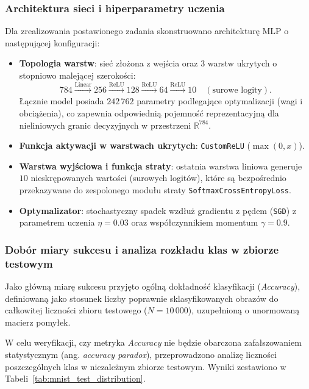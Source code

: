 \documentclass[11pt,a4paper]{article}
\begin{document}
\subsubsection{Architektura sieci i hiperparametry uczenia}
Dla zrealizowania postawionego zadania skonstruowano architekturę MLP o następującej konfiguracji:
\begin{itemize}
    \item \textbf{Topologia warstw}: sieć złożona z wejścia oraz 3 warstw ukrytych o stopniowo malejącej szerokości:
    \begin{equation}
        784 \xrightarrow{\text{Linear}} 256 \xrightarrow{\text{ReLU}} 128 \xrightarrow{\text{ReLU}} 64 \xrightarrow{\text{ReLU}} 10 \quad (\text{surowe logity}).
    \end{equation}
    Łącznie model posiada $242\,762$ parametry podlegające optymalizacji (wagi i obciążenia), co zapewnia odpowiednią pojemność reprezentacyjną dla nieliniowych granic decyzyjnych w przestrzeni $\mathbb{R}^{784}$.
    \item \textbf{Funkcja aktywacji w warstwach ukrytych}: \texttt{CustomReLU} ($\max(0, x)$).
    \item \textbf{Warstwa wyjściowa i funkcja straty}: ostatnia warstwa liniowa generuje $10$ nieskrępowanych wartości (surowych logitów), które są bezpośrednio przekazywane do zespolonego modułu straty \texttt{SoftmaxCrossEntropyLoss}. 
    \item \textbf{Optymalizator}: stochastyczny spadek wzdłuż gradientu z pędem (\texttt{SGD}) z parametrem uczenia $\eta = 0.03$ oraz współczynnikiem momentum $\gamma = 0.9$.
\end{itemize}

\subsubsection{Dobór miary sukcesu i analiza rozkładu klas w zbiorze testowym}
Jako główną miarę sukcesu przyjęto ogólną dokładność klasyfikacji (\emph{Accuracy}), definiowaną jako stosunek liczby poprawnie sklasyfikowanych obrazów do całkowitej liczności zbioru testowego ($N = 10\,000$), uzupełnioną o unormowaną macierz pomyłek.

W celu weryfikacji, czy metryka \emph{Accuracy} nie będzie obarczona zafałszowaniem statystycznym (ang. \emph{accuracy paradox}), przeprowadzono analizę liczności poszczególnych klas w niezależnym zbiorze testowym. Wyniki zestawiono w Tabeli~\ref{tab:mnist_test_distribution}.
\end{document}
